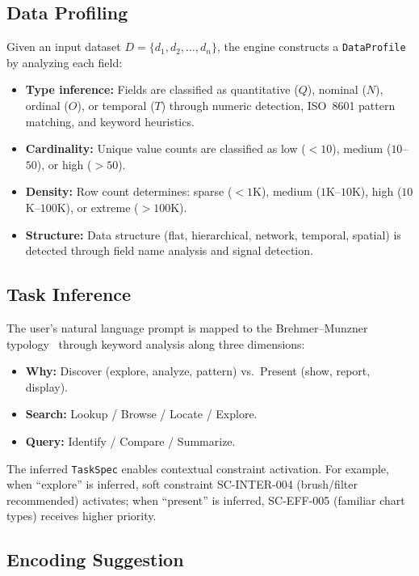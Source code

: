 \documentclass[final,5p,times,twocolumn]{elsarticle}
\begin{document}
\subsection{Data Profiling}

Given an input dataset $D = \{d_1, d_2, \ldots, d_n\}$, the engine constructs a \texttt{DataProfile} by analyzing each field:

\begin{itemize}
  \item \textbf{Type inference:} Fields are classified as quantitative ($Q$), nominal ($N$), ordinal ($O$), or temporal ($T$) through numeric detection, ISO~8601 pattern matching, and keyword heuristics.
  \item \textbf{Cardinality:} Unique value counts are classified as low ($<10$), medium ($10$--$50$), or high ($>50$).
  \item \textbf{Density:} Row count determines: sparse ($<1$K), medium ($1$K--$10$K), high ($10$K--$100$K), or extreme ($>100$K).
  \item \textbf{Structure:} Data structure (flat, hierarchical, network, temporal, spatial) is detected through field name analysis and signal detection.
\end{itemize}

\subsection{Task Inference}

The user's natural language prompt is mapped to the Brehmer--Munzner typology~\cite{brehmer2013multi} through keyword analysis along three dimensions:

\begin{itemize}
  \item \textbf{Why:} Discover (explore, analyze, pattern) vs.\ Present (show, report, display).
  \item \textbf{Search:} Lookup / Browse / Locate / Explore.
  \item \textbf{Query:} Identify / Compare / Summarize.
\end{itemize}

The inferred \texttt{TaskSpec} enables contextual constraint activation.
For example, when ``explore'' is inferred, soft constraint SC-INTER-004 (brush/filter recommended) activates; when ``present'' is inferred, SC-EFF-005 (familiar chart types) receives higher priority.

\subsection{Encoding Suggestion}
\end{document}
